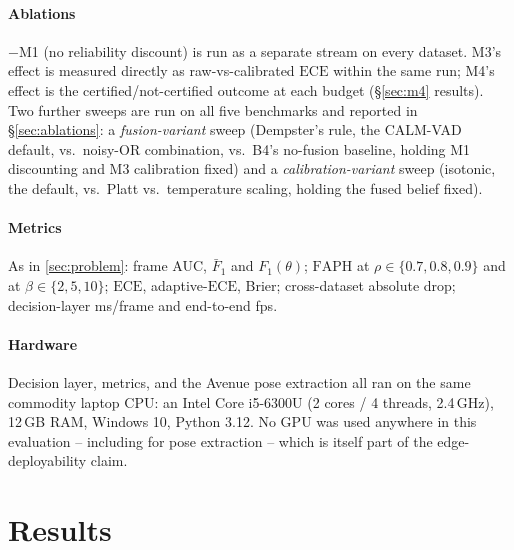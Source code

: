 \documentclass[conference]{IEEEtran}
\newif\ifdraftmode
\newcommand{\pend}[1]{\textcolor{blue!60!black}{#1}}
\newcommand{\pend}[1]{#1}
\newcommand{\faph}{\mathrm{FAPH}}
\newcommand{\ece}{\mathrm{ECE}}
\newcommand{\method}{CALM-VAD}
\begin{document}
\paragraph{Ablations}
$-$M1 (no reliability discount) is run as a separate stream on every dataset.
M3's effect is measured directly as raw-vs-calibrated $\ece$ within the same
run; M4's effect is the certified/not-certified outcome at each budget
(\S\ref{sec:m4} results). Two further sweeps are run on all five benchmarks
and reported in \S\ref{sec:ablations}: a \emph{fusion-variant} sweep
(Dempster's rule, the \method{} default, vs.\ noisy-OR combination, vs.\ B4's
no-fusion baseline, holding M1 discounting and M3 calibration fixed) and a
\emph{calibration-variant} sweep (isotonic, the default, vs.\ Platt vs.\
temperature scaling, holding the fused belief fixed).

\paragraph{Metrics}
As in \cref{sec:problem}: frame AUC, $\bar F_1$ and $F_1(\theta)$; $\faph$ at
$\rho\in\{0.7,0.8,0.9\}$ and at $\beta\in\{2,5,10\}$; $\ece$, adaptive-$\ece$,
Brier; cross-dataset absolute drop; decision-layer ms/frame and end-to-end fps.

\paragraph{Hardware}
Decision layer, metrics, and the Avenue pose extraction all ran on the same
commodity laptop CPU: an Intel Core i5-6300U (2 cores / 4 threads,
2.4\,GHz), 12\,GB RAM, Windows 10, Python 3.12. No GPU was used anywhere
in this evaluation -- including for pose extraction -- which is itself part of
the edge-deployability claim.

\section{Results}
\label{sec:results}

\ifdraftmode
\noindent\textcolor{red!70!black}{\small The tables below give the exact rows
the released harness (\texttt{python -m calm.harness}) produces; cells are
\pend{pending} the experimental campaign. The analysis text states the
hypothesis each table tests.}
\medskip
\fi
\end{document}
